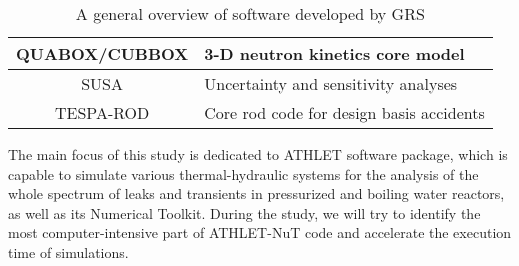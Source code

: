 \begin{table}[htb]
\begin{tabular}{|c|l|}
QUABOX/CUBBOX & 3-D neutron kinetics core model                                                                                                                                                              \\ \hline
SUSA          & Uncertainty and sensitivity analyses                                                                                                                                                         \\ \hline
TESPA-ROD     & Core rod code for design basis accidents                                                                                                                                                     \\ \hline
\end{tabular}
\caption{A general overview of software developed by GRS}
\label{table:introduction-grs-software}
\end{table}



The main focus of this study is dedicated to ATHLET software package, which is capable to simulate various thermal-hydraulic systems for the analysis of the whole spectrum of leaks and transients in pressurized and boiling water reactors, as well as its Numerical Toolkit. During the study, we will try to identify the most computer-intensive part of ATHLET-NuT code and accelerate the execution time of simulations.\\

